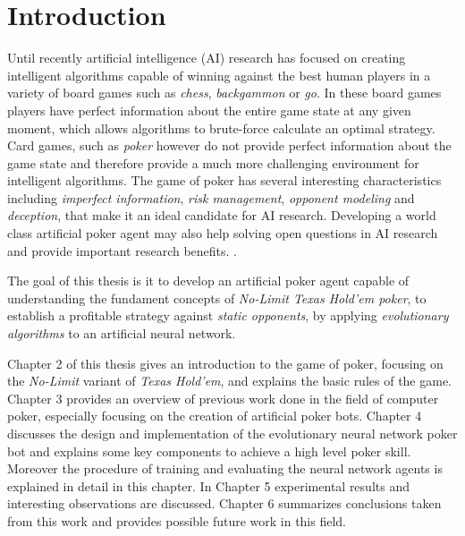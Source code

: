 

\chapter{Introduction}
\label{cha:introduction}

Until recently artificial intelligence (AI) research has focused on creating intelligent algorithms capable of winning against the best human players in a variety of board games such as \textit{chess}, \textit{backgammon} or \textit{go}. In these board games players have perfect information about the entire game state at any given moment, which allows algorithms to brute-force calculate an optimal strategy. Card games, such as \textit{poker} however do not provide perfect information about the game state and therefore provide a much more challenging environment for intelligent algorithms. The game of poker has several interesting characteristics including \textit{imperfect information}, \textit{risk management}, \textit{opponent modeling} and \textit{deception}, that make it an ideal candidate for AI research. Developing a world class artificial poker agent may also help solving open questions in AI research and provide important research benefits. \cite{challenge_of_poker, pena}.\par
 The goal of this thesis is it to develop an artificial poker agent capable of understanding the fundament concepts of \textit{No-Limit Texas Hold'em poker}, to establish a profitable strategy against \textit{static opponents}, by applying \textit{evolutionary algorithms} to an artificial neural network.\par
 Chapter 2 of this thesis gives an introduction to the game of poker, focusing on the \textit{No-Limit} variant of \textit{Texas Hold'em}, and explains the basic rules of the game. Chapter 3 provides an overview of previous work done in the field of computer poker, especially focusing on the creation of artificial poker bots. Chapter 4 discusses the design and implementation of the evolutionary neural network poker bot and explains some key components to achieve a high level poker skill. Moreover the procedure of training and evaluating the neural network agents is explained in detail in this chapter. In Chapter 5 experimental results and interesting observations are discussed. Chapter 6 summarizes conclusions taken from this work and provides possible future work in this field. 

